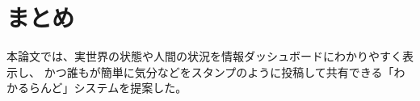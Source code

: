 \section{まとめ}
本論文では、実世界の状態や人間の状況を情報ダッシュボードにわかりやすく表示し、
かつ誰もが簡単に気分などをスタンプのように投稿して共有できる「わかるらんど」システムを提案した。
